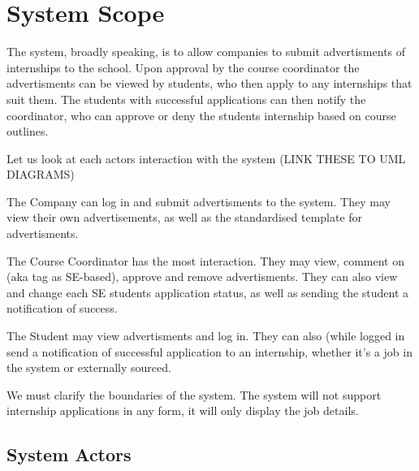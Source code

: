 \documentclass{l3deliverable}
\begin{document}

\section{System Scope}




The system, broadly speaking, is to allow companies to submit advertisments 
of internships to the school. Upon approval by the course coordinator the 
advertisments can be viewed by students, who then apply to any internships 
that suit them. The students with successful applications can then notify 
the coordinator, who can approve or deny the students internship based on 
course outlines. 

Let us look at each actors interaction with the system (LINK THESE TO UML
DIAGRAMS)

The Company can log in and submit advertisments to the system. They may 
view their own advertisements, as well as the standardised template for 
advertisments.

The Course Coordinator has the most interaction. They may view, comment 
on (aka tag as SE-based), approve and remove advertisments. They can also 
view and change each SE students application status, as well as sending 
the student a notification of success.

The Student may view advertisments and log in. They can also (while logged 
in send a notification of successful application to an internship, whether 
it's a job in the system or externally sourced.

We must clarify the boundaries of the system. The system will not 
support internship applications in any form, it will only display the 
job details. 



\subsection{System Actors}
\end{document}
